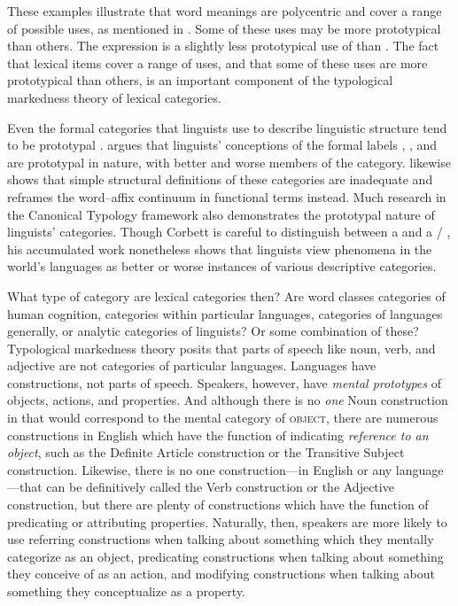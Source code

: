 These examples illustrate that word meanings are polycentric and cover a range of possible uses, as mentioned in . Some of these uses may be more prototypical than others. The  expression  is a slightly less prototypical use of  than . The fact that lexical items cover a range of uses, and that some of these uses are more prototypical than others, is an important component of the typological markedness theory of lexical categories.

Even the formal categories that linguists use to describe linguistic structure tend to be prototypal \parencite[xii, 201]{Taylor2003}. \textcite[§11.1]{Taylor2003} argues that linguists' conceptions of the formal labels , , and  are prototypal in nature, with better and worse members of the category. \textcite{Haspelmath2005} likewise shows that simple structural definitions of these categories are inadequate and reframes the word–affix continuum in functional terms instead. Much research in the Canonical Typology framework \parencite{Corbett2005} also demonstrates the prototypal nature of linguists' categories. Though Corbett is careful to distinguish between a  and a  /  \parencite[142]{Corbett2010}, his accumulated work nonetheless shows that linguists view phenomena in the world's languages as better or worse instances of various descriptive categories.

What type of category are lexical categories then? Are word classes categories of human cognition, categories within particular languages, categories of languages generally, or analytic categories of linguists? Or some combination of these? Typological markedness theory posits that parts of speech like noun, verb, and adjective are not categories of particular languages. Languages have constructions, not parts of speech. Speakers, however, have \emph{mental prototypes} of objects, actions, and properties. And although there is no \emph{one} Noun construction in  that would correspond to the mental category of \textsc{object}, there are numerous constructions in English which have the function of indicating \emph{reference to an object}, such as the Definite Article construction or the Transitive Subject construction. Likewise, there is no one construction—in English or any language—that can be definitively called the Verb construction or the Adjective construction, but there are plenty of constructions which have the function of predicating or attributing properties. Naturally, then, speakers are more likely to use referring constructions when talking about something which they mentally categorize as an object, predicating constructions when talking about something they conceive of as an action, and modifying constructions when talking about something they conceptualize as a property.

